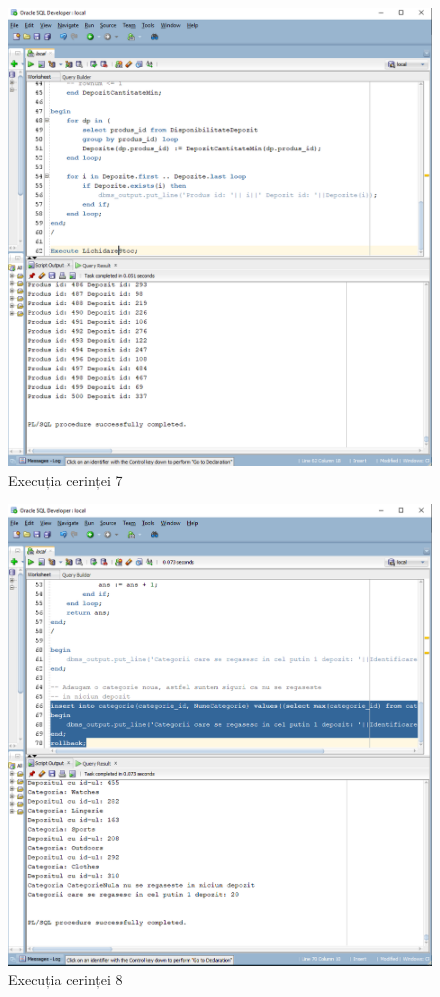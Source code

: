 \documentclass[12pt]{article}
\begin{document}
\begin{figure}[htp]
\centering
\includegraphics[width=1\linewidth]{Cerinta7.png}
\caption{Execuția cerinței 7}
\end{figure}

\begin{figure}[htp]
\centering
\includegraphics[width=1\linewidth]{Cerinta8.png}
\caption{Execuția cerinței 8}
\end{figure}
\end{document}
